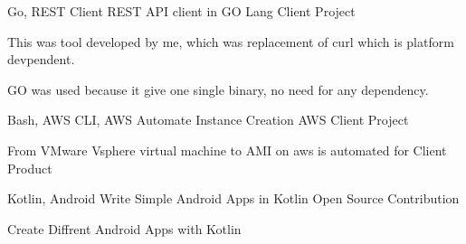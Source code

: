 \begin{cventries}
    \cventry
    {Go, REST Client} %
    {REST API client in GO Lang} %
    {Client Project} %
    {} %
    {
      \begin{cvitems} %
        \item {This was tool developed by me, which was replacement of curl which is platform devpendent.}
        \item {GO was used because it give one single binary, no need for any dependency.}
      \end{cvitems}
    }
    \cventry
    {Bash, AWS CLI, AWS} %
    {Automate Instance Creation AWS} %
    {Client Project} %
    {} %
    {
      \begin{cvitems} %
        \item {From VMware Vsphere virtual machine to AMI on aws is automated for Client Product}
      \end{cvitems}
    }
    \cventry
    {Kotlin, Android} %
    {Write Simple Android Apps in Kotlin} %
    {Open Source Contribution } %
    {} %
    {
      \begin{cvitems} %
        \item {Create Diffrent Android Apps with Kotlin}
      \end{cvitems}
    }
    \vspace{8mm}






\end{cventries}

